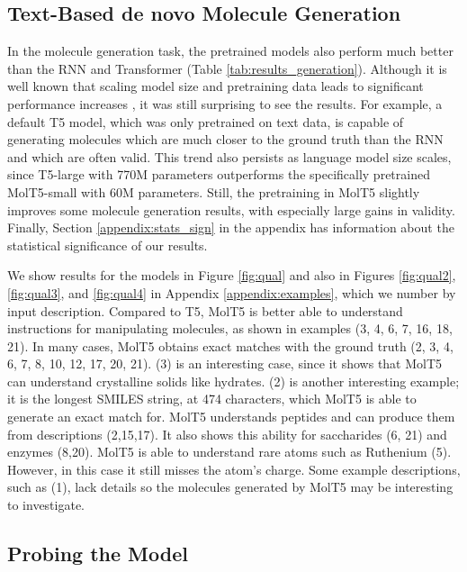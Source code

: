 \subsection{Text-Based de novo Molecule Generation}

In the molecule generation task, the pretrained models also perform much better than the RNN and Transformer (Table \ref{tab:results_generation}). Although it is well known that scaling model size and pretraining data leads to significant performance increases \cite{kaplan2020scaling}, it was still surprising to see the results. For example, a default T5 model, which was only pretrained on text data, is capable of generating molecules which are much closer to the ground truth than the RNN and which are often valid. This trend also persists as language model size scales, since T5-large with 770M parameters outperforms the specifically pretrained MolT5-small with 60M parameters. Still, the pretraining in MolT5 slightly improves some molecule generation results, with especially large gains in validity. Finally, Section \ref{appendix:stats_sign} in the appendix has information about the statistical significance of our results.


We show results for the models in Figure \ref{fig:qual} and also in Figures \ref{fig:qual2}, \ref{fig:qual3}, and \ref{fig:qual4} in Appendix \ref{appendix:examples}, which we number by input description. Compared to T5, MolT5 is better able to understand instructions for manipulating molecules, as shown in examples (3, 4, 6, 7, 16, 18, 21). In many cases, MolT5 obtains exact matches with the ground truth (2, 3, 4, 6, 7, 8, 10, 12, 17, 20, 21). (3) is an interesting case, since it shows that MolT5 can understand crystalline solids like hydrates. (2) is another interesting example; it is the longest SMILES string, at 474 characters, which MolT5 is able to generate an exact match for. MolT5 understands peptides and can produce them from descriptions (2,15,17). It also shows this ability for saccharides (6, 21) and enzymes (8,20). MolT5 is able to understand rare atoms such as Ruthenium (5). However, in this case it still misses the atom's charge. Some example descriptions, such as (1), lack details so the molecules generated by MolT5 may be interesting to investigate. 





\subsection{Probing the Model}

